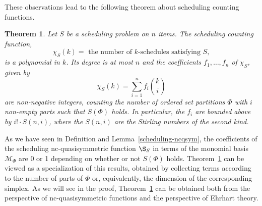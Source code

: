 \documentclass[12pt,reqno]{amsart}
\numberwithin{definition}{section}
\newtheorem{theorem}[definition]{Theorem}
\theoremstyle{definition}
\newcommand{\ZZ}{\mathbb{Z}}
\newcommand{\SSS}{\mathcal{S}}
\newcommand{\ehr}{\operatorname{ehr}}
\newcommand{\ncM}{\mathcal{M}}
\newcommand{\poly}{\chi} %
\begin{document}
These observations lead to the following theorem about scheduling counting functions. 



\begin{theorem}
\label{fbasis}
Let $S$ be a scheduling problem on $n$ items.
The scheduling counting function,
 $$\poly_S(k) = \textrm{ the number of $k$-schedules satisfying $S$}, $$ is a polynomial in $k$.
  Its degree is at most $n$ and the coefficients $f_1,\ldots,f_n$ of $\poly_S$, given by
\begin{equation}
\label{eqn:fbasis}
  \poly_S(k) = \sum_{i=1}^n f_i\binom{k}{i}
\end{equation}
are non-negative integers, counting the number of ordered set partitions $\Phi$ with $i$ non-empty parts such that $S(\Phi)$ holds. In particular, the $f_i$ are bounded above by $i!\cdot S(n,i)$, where the $S(n,i)$ are the Stirling numbers of the second kind.

\end{theorem}

As we have seen in Definition and Lemma~\ref{scheduling-ncqsym}, the coefficients of the scheduling nc-quasisymmetric function $\S_S$ in terms of the monomial basis $\ncM_\Phi$ are 0 or 1 depending on whether or not $S(\Phi)$ holds. Theorem~\ref{fbasis} can be viewed as a specialization of this results, obtained by collecting terms according to the number of parts of $\Phi$ or, equivalently, the dimension of the corresponding simplex. As we will see in the proof, Theorem~\ref{fbasis} can be obtained both from the perspective of nc-quasisymmetric functions and the perspective of Ehrhart theory.
\end{document}
